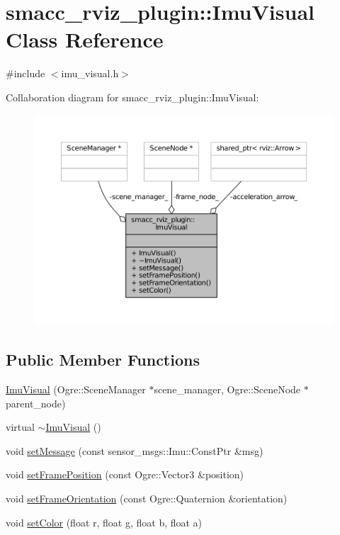 \hypertarget{classsmacc__rviz__plugin_1_1ImuVisual}{}\section{smacc\+\_\+rviz\+\_\+plugin\+:\+:Imu\+Visual Class Reference}
\label{classsmacc__rviz__plugin_1_1ImuVisual}


{\ttfamily \#include $<$imu\+\_\+visual.\+h$>$}



Collaboration diagram for smacc\+\_\+rviz\+\_\+plugin\+:\+:Imu\+Visual\+:
\nopagebreak
\begin{figure}[H]
\begin{center}
\leavevmode
\includegraphics[width=350pt]{classsmacc__rviz__plugin_1_1ImuVisual__coll__graph}
\end{center}
\end{figure}
\subsection*{Public Member Functions}
\begin{DoxyCompactItemize}
\item 
\hyperlink{classsmacc__rviz__plugin_1_1ImuVisual_a3963b29a785b0b95e56ac860cb58b000}{Imu\+Visual} (Ogre\+::\+Scene\+Manager $\ast$scene\+\_\+manager, Ogre\+::\+Scene\+Node $\ast$parent\+\_\+node)
\item 
virtual \hyperlink{classsmacc__rviz__plugin_1_1ImuVisual_acabcd6898e61f77c5353205539457db1}{$\sim$\+Imu\+Visual} ()
\item 
void \hyperlink{classsmacc__rviz__plugin_1_1ImuVisual_a69589c7845b2e29e092460b1ee8a8275}{set\+Message} (const sensor\+\_\+msgs\+::\+Imu\+::\+Const\+Ptr \&msg)
\item 
void \hyperlink{classsmacc__rviz__plugin_1_1ImuVisual_a405f4e15692f2443f202bc55d989d669}{set\+Frame\+Position} (const Ogre\+::\+Vector3 \&position)
\item 
void \hyperlink{classsmacc__rviz__plugin_1_1ImuVisual_ac308baf22f4bfb15b69b18776d22f181}{set\+Frame\+Orientation} (const Ogre\+::\+Quaternion \&orientation)
\item 
void \hyperlink{classsmacc__rviz__plugin_1_1ImuVisual_a6b5973fedfb8620c1e1493840ae7c76b}{set\+Color} (float r, float g, float b, float a)
\end{DoxyCompactItemize}
